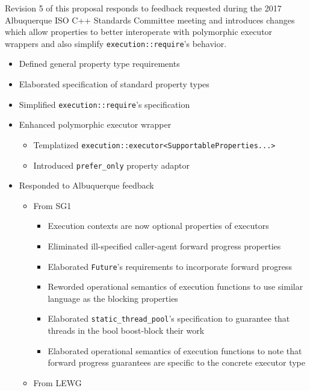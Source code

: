 \documentclass[a4paper,12pt,notitlepage,twoside,openright]{article}
\begin{document}
Revision 5 of this proposal responds to feedback requested during the
2017 Albuquerque ISO C++ Standards Committee meeting and introduces
changes which allow properties to better interoperate with polymorphic
executor wrappers and also simplify
\texttt{execution::require}'s behavior.

\begin{itemize}

\item
  Defined general property type requirements
\item
  Elaborated specification of standard property types
\item
  Simplified \texttt{execution::require}'s specification
\item
  Enhanced polymorphic executor wrapper

  \begin{itemize}

  \item
    Templatized
    \texttt{execution::executor<SupportableProperties...>}
  \item
    Introduced \texttt{prefer_only} property adaptor
  \end{itemize}
\item
  Responded to Albuquerque feedback

  \begin{itemize}

  \item
    From SG1

    \begin{itemize}

    \item
      Execution contexts are now optional properties of executors
    \item
      Eliminated ill-specified caller-agent forward progress properties
    \item
      Elaborated \texttt{Future}'s requirements to
      incorporate forward progress
    \item
      Reworded operational semantics of execution functions to use
      similar language as the blocking properties
    \item
      Elaborated \texttt{static_thread_pool}'s specification
      to guarantee that threads in the bool boost-block their work
    \item
      Elaborated operational semantics of execution functions to note
      that forward progress guarantees are specific to the concrete
      executor type
    \end{itemize}
  \item
    From LEWG


\end{itemize}
\end{itemize}
\end{document}
